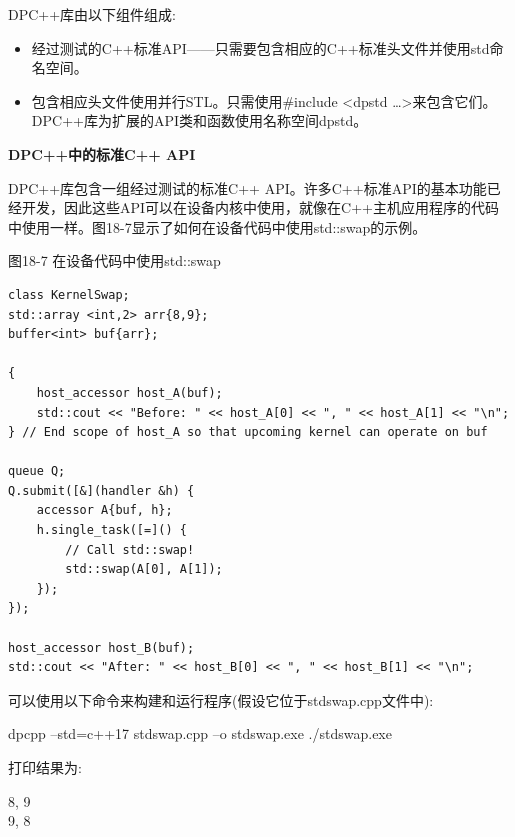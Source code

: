 DPC++库由以下组件组成:\par

\begin{itemize}
	\item 经过测试的C++标准API——只需要包含相应的C++标准头文件并使用std命名空间。
	\item 包含相应头文件使用并行STL。只需使用\#include <dpstd …>来包含它们。DPC++库为扩展的API类和函数使用名称空间dpstd。
\end{itemize}

\hspace*{\fill} \par %
\textbf{DPC++中的标准C++ API}

DPC++库包含一组经过测试的标准C++ API。许多C++标准API的基本功能已经开发，因此这些API可以在设备内核中使用，就像在C++主机应用程序的代码中使用一样。图18-7显示了如何在设备代码中使用std::swap的示例。\par

\hspace*{\fill} \par %
图18-7 在设备代码中使用std::swap
\begin{lstlisting}[caption={}]
class KernelSwap;
std::array <int,2> arr{8,9};
buffer<int> buf{arr};

{
	host_accessor host_A(buf);
	std::cout << "Before: " << host_A[0] << ", " << host_A[1] << "\n";
} // End scope of host_A so that upcoming kernel can operate on buf

queue Q;
Q.submit([&](handler &h) {
	accessor A{buf, h};
	h.single_task([=]() {
		// Call std::swap!
		std::swap(A[0], A[1]);
	});
});

host_accessor host_B(buf);
std::cout << "After: " << host_B[0] << ", " << host_B[1] << "\n";
\end{lstlisting}

可以使用以下命令来构建和运行程序(假设它位于stdswap.cpp文件中):\par

\begin{tcolorbox}[colback=white,colframe=black]
dpcpp –std=c++17 stdswap.cpp –o stdswap.exe ./stdswap.exe
\end{tcolorbox}

打印结果为:\par

\begin{tcolorbox}[colback=white,colframe=black]
8, 9\\
9, 8
\end{tcolorbox}

